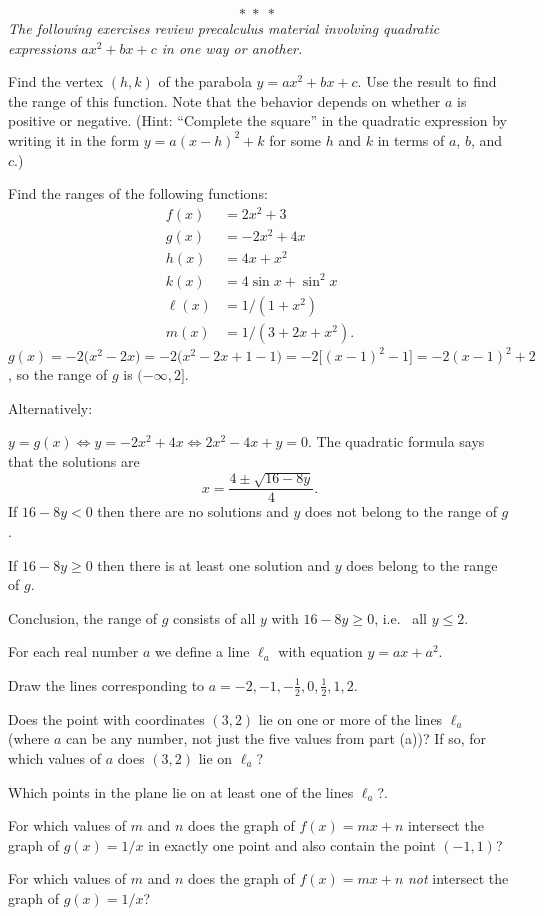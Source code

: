 \begin{multicols}{2}
\[
  *\; *\; *\;
\]
\noindent\itshape%
The following exercises review precalculus material involving quadratic
expressions $ax^2+bx+c$ in one way or another.\upshape



\problem Find the vertex $(h,k)$ of the parabola $y=ax^2+bx+c$.  Use the result 
to find the range of this function.  Note that the behavior depends on whether
$a$ is positive or negative.  (Hint: ``Complete the square'' in the quadratic
expression by writing it in the form $y=a(x-h)^2 + k$ for some $h$ and $k$ in
terms of $a$, $b$, and $c$.)



\problem Find the ranges of the following functions: 
\begin{align*}
  f(x) &= 2x^2+3 \\
  g(x) &= -2x^2+4x \\
  h(x) &= 4x +x^2\\
  k(x) &= 4\sin x + \sin^2 x \\
  \ell(x) &= 1/(1+x^2)\\
  m(x) &= 1/(3+2x+x^2).
\end{align*}
\answer 
$g(x) = -2\bigl(x^2-2x\bigr)
= -2\bigl(x^2-2x+1 -1\bigr)
= -2\bigl[(x-1)^2 -1\bigr]
=-2(x-1)^2 + 2$, so the range of $g$ is $(-\infty, 2]$.

Alternatively:


$y = g(x) \iff y = -2x^2+4x \iff 2x^2-4x+y = 0$.
The quadratic formula says that the solutions are
\[
  x= \frac{4\pm\sqrt{16-8y}} {4}.
\]
If $16-8y<0$ then there are no solutions and $y$ does
not belong to the range of $g$.

If $16-8y\geq0$ then there is at least one solution
and  $y$ does belong to the range of $g$.


Conclusion, the range of $g$ consists of all $y$ with
$16-8y\geq 0$, i.e.~ all $y\leq2$.
\endanswer


\problem \groupproblem For each real number $a$ we define a line 
$\ell_a$ with equation $y=ax+a^2$.


\subprob Draw the lines corresponding to $a=-2, -1, -\frac12, 0,
\frac12, 1, 2$.


\subprob Does the point with coordinates $(3, 2)$ lie on one or more of
the lines $\ell_a$ (where $a$ can be any number, not just the five
values from part (a))?  If so, for which values of $a$ does $(3,2)$ lie on
$\ell_a$?

\subprob Which points in the plane lie on at least one of the lines
$\ell_a$?.




\problem For which values of $m$ and $n$ does the graph of $f(x) = mx+n$ 
intersect the graph of $g(x) = 1/x$ in exactly one point and also
contain the point $(-1,1)$?




\problem For which values of $m$ and $n$ does the graph of $f(x) = mx+n$ 
\emph{not} intersect the graph of $g(x) = 1/x$?



\end{multicols}
\noproblemfont

